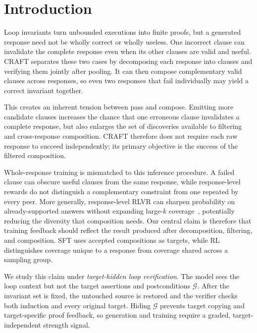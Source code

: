 \section{Introduction}\label{sec:intro}

Loop invariants turn unbounded executions into finite proofs, but a generated
response need not be wholly correct or wholly useless.  One incorrect clause
can invalidate the complete response even when its other clauses are valid and
useful.  CRAFT separates these two cases by decomposing each response into
clauses and verifying them jointly after pooling.  It can then compose
complementary valid clauses across responses, so even two responses that fail
individually may yield a correct invariant together.

This creates an inherent tension between pass and compose.  Emitting more
candidate clauses increases the chance that one erroneous clause invalidates
a complete response, but also enlarges the set of discoveries available to
filtering and cross-response composition.  CRAFT therefore does not require
each raw response to succeed independently; its primary objective is the
success of the filtered composition.

Whole-response training is mismatched to this inference procedure.  A failed
clause can obscure useful clauses from the same response, while response-level
rewards do not distinguish a complementary constraint from one repeated by
every peer.  More generally,
response-level RLVR can sharpen probability on already-supported answers
without expanding large-\(k\) coverage~\citep{yue2025rlcapacity}, potentially
reducing the diversity that composition needs.  Our central claim is therefore
that training feedback should reflect the result produced after decomposition,
filtering, and composition.  SFT uses accepted compositions as targets, while
RL distinguishes coverage unique to a response from coverage shared across a
sampling group.

We study this claim under \emph{target-hidden loop verification}.  The model
sees the loop context but not the target assertions and postconditions \(\mathcal G\).
After the invariant set is fixed, the untouched source is restored and the
verifier checks both induction and every original target.  Hiding \(\mathcal G\)
prevents target copying and target-specific proof feedback, so generation and
training require a graded, target-independent strength signal.

